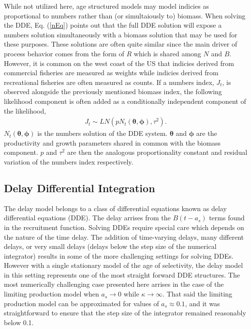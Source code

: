 %
While not utilized here, age structured models may model
indicies as proportional to numbers rather than (or simultaiously to)
biomass. When solving the DDE, Eq. (\ref{nEq}) points out that the full DDE
solution will expose a numbers solution simultaneously with a biomass solution
that may be used for these purposes. These solutions are often quite similar
since the main driver of process behavior comes from the form of $R$ which is
shared among $N$ and $B$.
However, it is common on the west coast of the US that indicies derived from commercial
fisheries are measured as weights %
while indicies derived from recreational fisheries are often measured as counts.
If a numbers index, $J_t$, is observed alongside the previously
mentioned biomass index, the following likelihood component is often added as a
conditionally independent component of the likelihood, %
\begin{align}
J_t \sim LN(p N_t(\bm{\theta}, \bm{\phi}), \tau^{2}) \label{nL}.
\end{align}
%
$N_t(\bm{\theta}, \bm{\phi})$ is the numbers solution of the DDE system.
$\bm{\theta}$ and $\bm{\phi}$ are the productivity and growth parameters shared in 
common with the biomass component. $p$ and $\tau^2$ are then the analogous
proportionality constant and residual variation of the numbers index respectively.

%
\subsection{Delay Differential Integration}

%
The delay model belongs to a class of differential equations known as delay
differential equations (DDE). The delay arrises from the $B(t-a_s)$ terms
found in the recruitment function. Solving DDEs require special care which
depends on the nature of the time delay. The addition of time-varying delays,
many different delays, or very small delays (delays below the step size of the
numerical integrator) results in some of the more challenging settings for
solving DDEs. However with a single stationary model of the age of selectivity,
the delay model in this setting represents one of the most straight forward
DDE structures. The most numerically challenging case presented here arrises
in the case of the limiting production model when $a_s\to0$ while $\kappa\to\infty$.
That said the limiting production model can be approximated for values of
$a_s\approx0.1$, and it was straightforward to ensure that the step size of
the integrator remained reasonably below 0.1.


